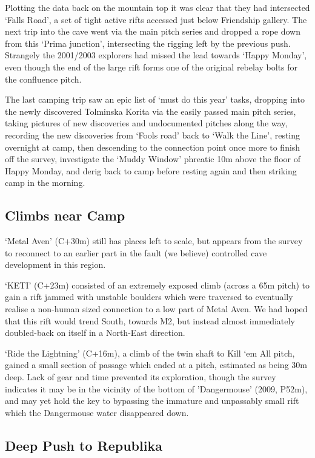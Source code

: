 Plotting the data back on the mountain top it was clear that they had
intersected `Falls Road', a set of tight active rifts accessed just
below Friendship gallery. The next trip into the cave went via the main
pitch series and dropped a rope down from this `Prima junction',
intersecting the rigging left by the previous push. Strangely the
2001/2003 explorers had missed the lead towards `Happy Monday', even
though the end of the large rift forms one of the original rebelay bolts
for the confluence pitch.

The last camping trip saw an epic list of `must do this year' tasks,
dropping into the newly discovered Tolminska Korita via the easily
passed main pitch series, taking pictures of new discoveries and
undocumented pitches along the way, recording the new discoveries from
`Fools road' back to `Walk the Line', resting overnight at camp, then
descending to the connection point once more to finish off the survey,
investigate the `Muddy Window' phreatic 10m above the floor of Happy
Monday, and derig back to camp before resting again and then striking
camp in the morning.

\subsection{Climbs near Camp}\label{climbs-near-camp}

`Metal Aven' (C+30m) still has places left to scale, but appears from
the survey to reconnect to an earlier part in the fault (we believe)
controlled cave development in this region.

`KETI' (C+23m) consisted of an extremely exposed climb (across a 65m
pitch) to gain a rift jammed with unstable boulders which were traversed
to eventually realise a non-human sized connection to a low part of
Metal Aven. We had hoped that this rift would trend South, towards M2,
but instead almost immediately doubled-back on itself in a North-East
direction.

`Ride the Lightning' (C+16m), a climb of the twin shaft to Kill `em All
pitch, gained a small section of passage which ended at a pitch,
estimated as being 30m deep. Lack of gear and time prevented its
exploration, though the survey indicates it may be in the vicinity of
the bottom of 'Dangermouse' (2009, P52m), and may yet hold the key to
bypassing the immature and unpassably small rift which the Dangermouse
water disappeared down.

\subsection{Deep Push to Republika}\label{deep-push-to-republika}

